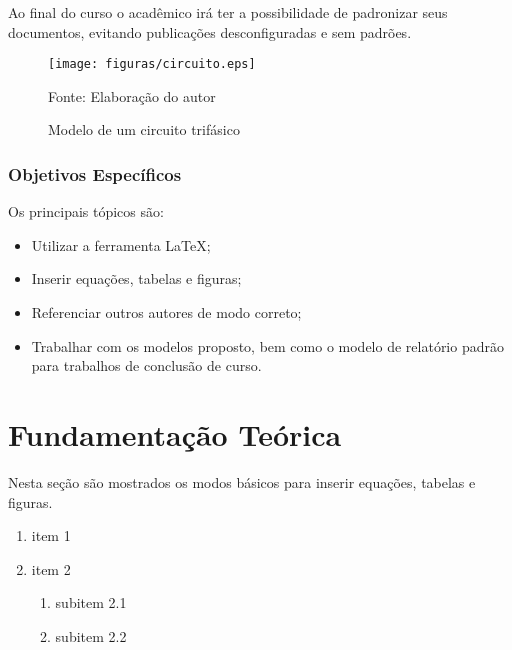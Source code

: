 \documentclass[a4paper,12pt,ruledheader,onecolumn,ceqn]{article}
\begin{document}
Ao final do curso o acadêmico irá ter a possibilidade de padronizar seus documentos, evitando publicações desconfiguradas e sem padrões.

\begin{figure}[ht!]
	\centering
	\caption{Modelo de um circuito trifásico \label{Fig:circuito1}}
	\vspace{-0.5cm}
	\texttt{[image: figuras/circuito.eps]}
	
	{Fonte: Elaboração do autor}
\end{figure}


\subsubsection{Objetivos Específicos}

Os principais tópicos são:

\begin{itemize}
\item Utilizar a ferramenta \LaTeX;
\item Inserir equações, tabelas e figuras;
\item Referenciar outros autores de modo correto;
\item Trabalhar com os modelos proposto, bem como o modelo de relatório padrão para trabalhos de conclusão de curso.
\end{itemize}

\section{Fundamentação Teórica}
Nesta seção são mostrados os modos básicos para inserir equações, tabelas e figuras.

\begin{enumerate}
\item item 1
\item item 2
\begin{enumerate}
\item subitem 2.1
\item subitem 2.2
\end{enumerate}
\end{enumerate}
\end{document}
